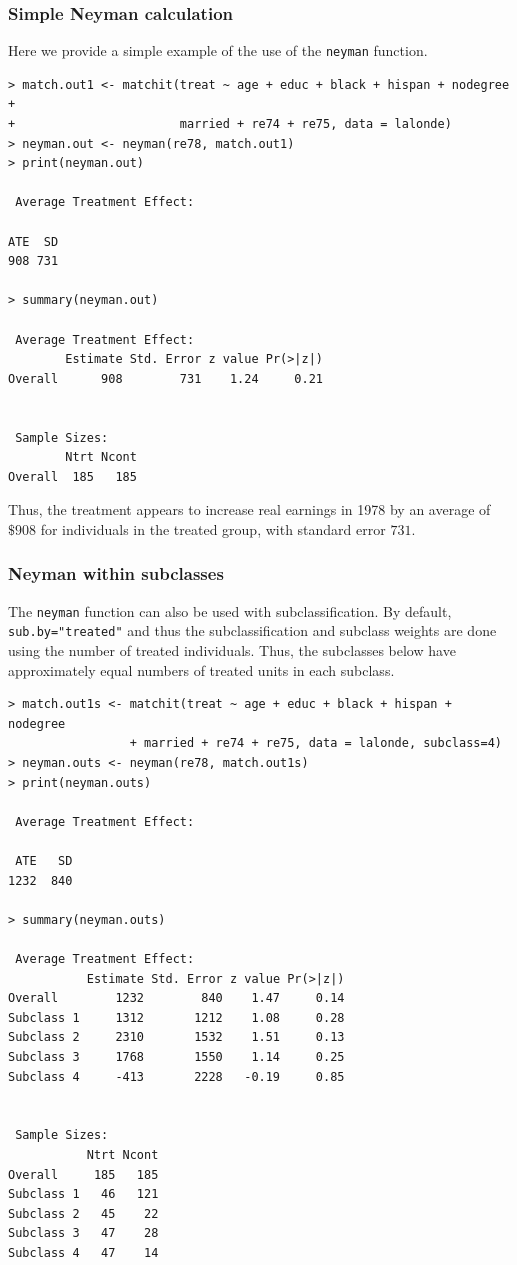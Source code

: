 \documentclass[oneside,letterpaper,titlepage]{article}
\begin{document}
\subsubsection{Simple Neyman calculation}
Here we provide a simple example of the use of the {\tt neyman} function.

\begin{verbatim}
> match.out1 <- matchit(treat ~ age + educ + black + hispan + nodegree +
+                       married + re74 + re75, data = lalonde)
> neyman.out <- neyman(re78, match.out1)
> print(neyman.out)
 
 Average Treatment Effect:
  
ATE  SD
908 731
 
> summary(neyman.out)
 
 Average Treatment Effect:
        Estimate Std. Error z value Pr(>|z|)
Overall      908        731    1.24     0.21
 
 
 Sample Sizes:
        Ntrt Ncont
Overall  185   185
\end{verbatim}

Thus, the treatment appears to increase real earnings in 1978 by an
average of $\$908$ for individuals in the treated group, with standard
error $731$.

\subsubsection{Neyman within subclasses}
The {\tt neyman} function can also be used with subclassification.  By
default, {\tt sub.by="treated"} and thus the subclassification and
subclass weights are done using the number of treated individuals.
Thus, the subclasses below have approximately equal numbers of treated
units in each subclass.

\begin{verbatim}
> match.out1s <- matchit(treat ~ age + educ + black + hispan + nodegree
                 + married + re74 + re75, data = lalonde, subclass=4)
> neyman.outs <- neyman(re78, match.out1s)
> print(neyman.outs)
 
 Average Treatment Effect:
  
 ATE   SD
1232  840
 
> summary(neyman.outs)
 
 Average Treatment Effect:
           Estimate Std. Error z value Pr(>|z|)
Overall        1232        840    1.47     0.14
Subclass 1     1312       1212    1.08     0.28
Subclass 2     2310       1532    1.51     0.13
Subclass 3     1768       1550    1.14     0.25
Subclass 4     -413       2228   -0.19     0.85
 
 
 Sample Sizes:
           Ntrt Ncont
Overall     185   185
Subclass 1   46   121
Subclass 2   45    22
Subclass 3   47    28
Subclass 4   47    14
\end{verbatim}
\end{document}
